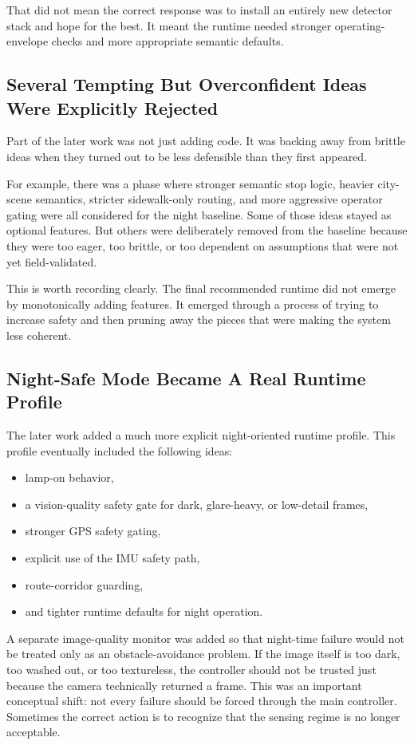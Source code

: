 \documentclass[11pt]{article}
\begin{document}
That did not mean the correct response was to install an entirely new detector stack and hope for the best. It meant the runtime needed stronger operating-envelope checks and more appropriate semantic defaults.

\subsection{Several Tempting But Overconfident Ideas Were Explicitly Rejected}
Part of the later work was not just adding code. It was backing away from brittle ideas when they turned out to be less defensible than they first appeared.

For example, there was a phase where stronger semantic stop logic, heavier city-scene semantics, stricter sidewalk-only routing, and more aggressive operator gating were all considered for the night baseline. Some of those ideas stayed as optional features. But others were deliberately removed from the baseline because they were too eager, too brittle, or too dependent on assumptions that were not yet field-validated.

This is worth recording clearly. The final recommended runtime did not emerge by monotonically adding features. It emerged through a process of trying to increase safety and then pruning away the pieces that were making the system less coherent.

\subsection{Night-Safe Mode Became A Real Runtime Profile}
The later work added a much more explicit night-oriented runtime profile. This profile eventually included the following ideas:
\begin{itemize}[leftmargin=*]
\item lamp-on behavior,
\item a vision-quality safety gate for dark, glare-heavy, or low-detail frames,
\item stronger GPS safety gating,
\item explicit use of the IMU safety path,
\item route-corridor guarding,
\item and tighter runtime defaults for night operation.
\end{itemize}

A separate image-quality monitor was added so that night-time failure would not be treated only as an obstacle-avoidance problem. If the image itself is too dark, too washed out, or too textureless, the controller should not be trusted just because the camera technically returned a frame. This was an important conceptual shift: not every failure should be forced through the main controller. Sometimes the correct action is to recognize that the sensing regime is no longer acceptable.
\end{document}
